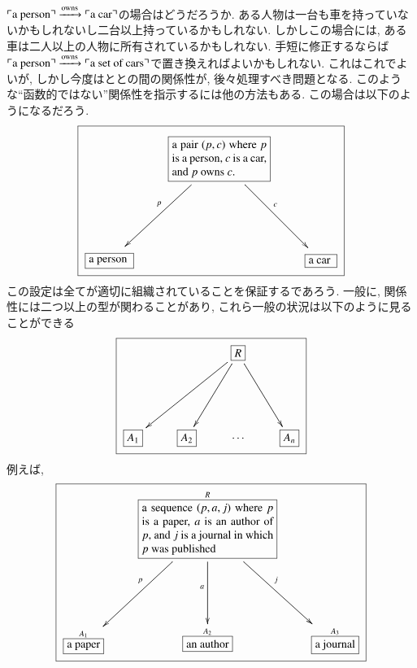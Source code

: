 
$\textrm{$\ulcorner$a person$\urcorner$}\xrightarrow{\textrm{owns}}\textrm{$\ulcorner$a car$\urcorner$}$の場合はどうだろうか. ある人物は一台も車を持っていないかもしれないし二台以上持っているかもしれない. しかしこの場合には, ある車は二人以上の人物に所有されているかもしれない. 手短に修正するならば$\textrm{$\ulcorner$a person$\urcorner$}\xrightarrow{\textrm{owns}}\textrm{$\ulcorner$a set of cars$\urcorner$}$で置き換えればよいかもしれない. これはこれでよいが, しかし今度はととの間の関係性が, 後々処理すべき問題となる. このような``函数的ではない''関係性を指示するには他の方法もある. この場合は以下のようになるだろう.
$$
\fbox{\xymatrix{&\obox{}{1.15in}{a pair $(p,c)$ where $p$ is a person, $c$ is a car, and $p$ owns $c$.}\ar[ddl]_p\ar[ddr]^c\\\\
\obox{}{.5in}{a person}&&\obox{}{.3in}{a car}}}
$$
この設定は全てが適切に組織されていることを保証するであろう. 一般に, 関係性には二つ以上の型が関わることがあり, これら一般の状況は以下のように見ることができる
$$\fbox{\xymatrixnocompile{&&\fbox{$R$}\ar[ddll]\ar[ddl]\ar[ddr]\\\\\fbox{$A_1$}&\fbox{$A_2$}&\cdots&\fbox{$A_n$}}}$$ 例えば, $$\fbox{\xymatrixnocompile{&\labox{R}{a sequence $(p,a,j)$ where $p$ is a paper, $a$ is an author of $p$, and $j$ is a journal in which $p$ was published}\ar[ddl]_p\ar[dd]_a\ar[ddr]^j\\\\\smbox{A_1}{a paper}&\smbox{A_2}{an author}&\smbox{A_3}{a journal}}}$$


